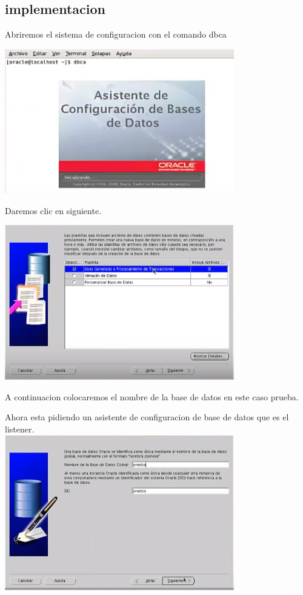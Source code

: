 \documentclass[12pt,letterpaper]{article}
\begin{document}
\subsection{implementacion}
Abriremos el sistema de configuracion con el comando dbca \\
\begin{center}
\includegraphics[width=10cm]{oraclelinux/30.png} 
\end{center}
Daremos clic en siguiente. \\
\begin{center}
\includegraphics[width=10cm]{oraclelinux/31.png}
\end{center}
A continuacion colocaremos el nombre de la base de datos en este caso  prueba. \\
\begin{center}
Ahora esta pidiendo un asistente de configuracion de base de datos que es el listener.\\
\includegraphics[width=10cm]{oraclelinux/32.png}
\end{center}
\end{document}
